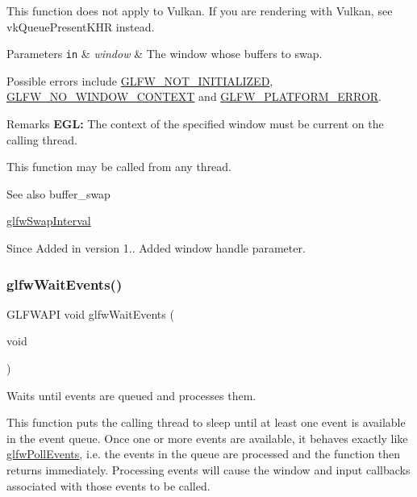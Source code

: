 This function does not apply to Vulkan. If you are rendering with Vulkan, see {\ttfamily vk\+Queue\+Present\+K\+HR} instead.


\begin{DoxyParams}[1]{Parameters}
\mbox{\tt in}  & {\em window} & The window whose buffers to swap.\\
\hline
\end{DoxyParams}
Possible errors include \hyperlink{group__errors_ga2374ee02c177f12e1fa76ff3ed15e14a}{G\+L\+F\+W\+\_\+\+N\+O\+T\+\_\+\+I\+N\+I\+T\+I\+A\+L\+I\+Z\+ED}, \hyperlink{group__errors_gacff24d2757da752ae4c80bf452356487}{G\+L\+F\+W\+\_\+\+N\+O\+\_\+\+W\+I\+N\+D\+O\+W\+\_\+\+C\+O\+N\+T\+E\+XT} and \hyperlink{group__errors_gad44162d78100ea5e87cdd38426b8c7a1}{G\+L\+F\+W\+\_\+\+P\+L\+A\+T\+F\+O\+R\+M\+\_\+\+E\+R\+R\+OR}.

\begin{DoxyRemark}{Remarks}
{\bfseries E\+GL\+:} The context of the specified window must be current on the calling thread.
\end{DoxyRemark}
This function may be called from any thread.

\begin{DoxySeeAlso}{See also}
buffer\+\_\+swap 

\hyperlink{group__context_ga12a595c06947cec4967c6e1f14210a8a}{glfw\+Swap\+Interval}
\end{DoxySeeAlso}
\begin{DoxySince}{Since}
Added in version 1..  Added window handle parameter. 
\end{DoxySince}
\mbox{\label{group__window_ga6e042d05823c11e11c7339b81a237738}} 
\subsubsection{\texorpdfstring{glfw\+Wait\+Events()}{glfwWaitEvents()}}
{\footnotesize\ttfamily G\+L\+F\+W\+A\+PI void glfw\+Wait\+Events (\begin{DoxyParamCaption}\item[{void}]{ }\end{DoxyParamCaption})}



Waits until events are queued and processes them. 

This function puts the calling thread to sleep until at least one event is available in the event queue. Once one or more events are available, it behaves exactly like \hyperlink{group__window_ga872d16e4c77f58c0436f356255920cfc}{glfw\+Poll\+Events}, i.\+e. the events in the queue are processed and the function then returns immediately. Processing events will cause the window and input callbacks associated with those events to be called.

